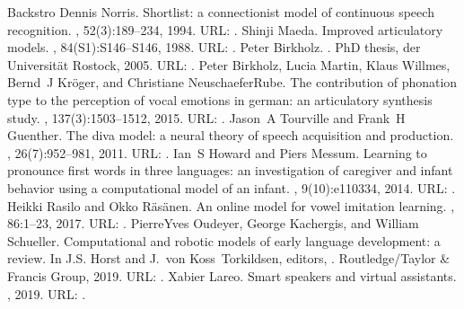 \documentclass[letterpaper,10pt,english]{jupyterBook}
\begin{document}
\begin{sphinxthebibliography}{Backstro}
\sphinxAtStartPar
Dennis Norris. Shortlist: a connectionist model of continuous speech recognition. , 52(3):189–234, 1994. URL: .
\sphinxAtStartPar
Shinji Maeda. Improved articulatory models. , 84(S1):S146–S146, 1988. URL: .
\sphinxAtStartPar
Peter Birkholz. . PhD thesis, der Universität Rostock, 2005. URL: .
\sphinxAtStartPar
Peter Birkholz, Lucia Martin, Klaus Willmes, Bernd J Kröger, and Christiane Neuschaefer\sphinxhyphen{}Rube. The contribution of phonation type to the perception of vocal emotions in german: an articulatory synthesis study. , 137(3):1503–1512, 2015. URL: .
\sphinxAtStartPar
Jason A Tourville and Frank H Guenther. The diva model: a neural theory of speech acquisition and production. , 26(7):952–981, 2011. URL: .
\sphinxAtStartPar
Ian S Howard and Piers Messum. Learning to pronounce first words in three languages: an investigation of caregiver and infant behavior using a computational model of an infant. , 9(10):e110334, 2014. URL: .
\sphinxAtStartPar
Heikki Rasilo and Okko Räsänen. An online model for vowel imitation learning. , 86:1–23, 2017. URL: .
\sphinxAtStartPar
Pierre\sphinxhyphen{}Yves Oudeyer, George Kachergis, and William Schueller. Computational and robotic models of early language development: a review. In J.S. Horst and J. von Koss Torkildsen, editors, . Routledge/Taylor \& Francis Group, 2019. URL: .
\sphinxAtStartPar
Xabier Lareo. Smart speakers and virtual assistants. , 2019. URL: .

\end{sphinxthebibliography}
\end{document}
